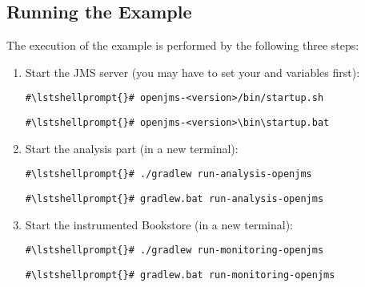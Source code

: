 \setPropertiesListing


\subsection{Running the Example}

 The execution of the example is performed by the following three steps:
\begin{enumerate}
\item Start the JMS server (you may have to set your  and  variables first):

\setBashListing
\begin{lstlisting}[caption=Start of the JMS server under UNIX-like systems]
#\lstshellprompt{}# openjms-<version>/bin/startup.sh
\end{lstlisting}
\begin{lstlisting}[caption=Start of the JMS server under Windows]
#\lstshellprompt{}# openjms-<version>\bin\startup.bat
\end{lstlisting}
\item Start the analysis part (in a new terminal):
\setBashListing
\begin{lstlisting}[caption=Start of the JMS server under UNIX-like systems]
#\lstshellprompt{}# ./gradlew run-analysis-openjms
\end{lstlisting}
\begin{lstlisting}[caption=Start of the JMS server under Windows]
#\lstshellprompt{}# gradlew.bat run-analysis-openjms
\end{lstlisting}
\item Start the instrumented Bookstore (in a new terminal):
\setBashListing
\begin{lstlisting}[caption=Start of the JMS server under UNIX-like systems]
#\lstshellprompt{}# ./gradlew run-monitoring-openjms
\end{lstlisting}
\begin{lstlisting}[caption=Start of the JMS server under Windows]
#\lstshellprompt{}# gradlew.bat run-monitoring-openjms
\end{lstlisting}
\end{enumerate}
